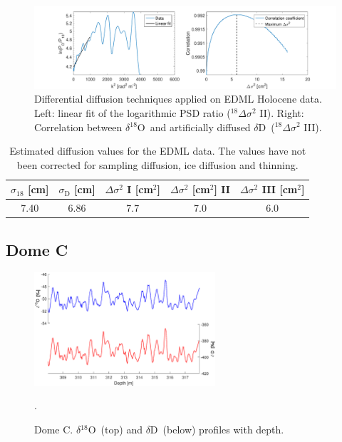 \documentclass[11pt, draftcls, onecolumn]{IEEEtran} %
\numberwithin{equation}{section}
\numberwithin{table}{section}
\numberwithin{figure}{section}
\newcommand{\delOx}{$\delta{}^{18}\mathrm{O}$}
\newcommand{\delD}{$\delta\mathrm{D}$}
\begin{document}
\begin{appendices}
\begin{figure}[H]
	\vspace*{2mm}
	\begin{center}
		\includegraphics[width=1\textwidth]{Figure_30}
		\caption{Differential diffusion techniques applied on EDML Holocene data. 
			Left: linear fit of the logarithmic PSD ratio ($^{18}\Delta\sigma^2$ II). Right: 
			Correlation between \delOx~and artificially diffused \delD~($^{18}\Delta\sigma^2$ III).}  \label{fig:EDML_fig_2}
	\end{center}
\end{figure}

\begin{table}[H]
	\center
	\caption{Estimated diffusion values for the EDML data.
		The values have not been corrected for sampling diffusion, ice diffusion and thinning.}
	\label{EDML}
	\begin{tabular}{c c c c c} 
		\toprule
		$\sigma_{18}$ [cm] & $\sigma_\mathrm{D}$ [cm] & $\Delta\sigma^2$ I [cm$^2$] & $\Delta\sigma^2$ [cm$^2$] II & $\Delta\sigma^2$ III [cm$^2$] \\
		\midrule
 		 7.40 &   6.86 &     7.7 &     7.0 &     6.0 \\
		\bottomrule		
	\end{tabular}
\end{table}


\clearpage
\subsection{Dome C}

\begin{figure}[H]
	\vspace*{2mm}
	\begin{center}
		\includegraphics[width=0.6\textwidth]{DomeC_holo}
		\caption{Dome C. \delOx~(top) and \delD~(below) profiles with depth.}  \label{fig:DomeC_holo}.
	\end{center}
\end{figure}


\end{appendices}
\end{document}
